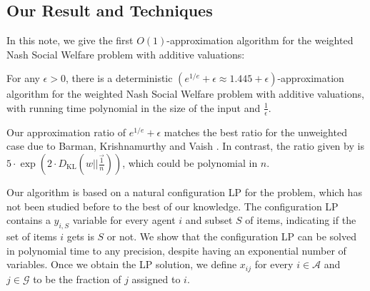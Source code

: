 \documentclass{theoretics}
\newcommand\calA{{\mathcal{A}}}
\newcommand\calG{{\mathcal{G}}}
\begin{document}
\subsection{Our Result and Techniques} 

In this note, we give the first $O(1)$-approximation algorithm for the weighted Nash Social Welfare problem with additive valuations:
\begin{theorem}
    \label{thm:main}
    For any $\epsilon > 0$, there is a deterministic $(e^{1/e} + \epsilon \approx 1.445 + \epsilon)$-approximation algorithm for the weighted Nash Social Welfare problem with additive valuations, with running time polynomial in the size of the input and $\frac1\epsilon$.
\end{theorem}

Our approximation ratio of $e^{1/e} + \epsilon$ matches the best ratio for the unweighted case due to Barman, Krishnamurthy and Vaish \cite{BKV18}.  In contrast, the ratio given by \cite{BLP24} is $5\cdot \exp(2 \cdot D_{\text{KL}}(w || \frac{\vec{1}}{n}))$, which could be polynomial in $n$. 
%

Our algorithm is based on a natural configuration LP for the problem, which has not been studied before to the best of our knowledge.  The configuration LP contains a $y_{i, S}$ variable for every agent $i$ and subset $S$ of items, indicating if the set of items $i$ gets is $S$ or not. We show that the configuration LP can be solved in polynomial time to any precision, despite having an exponential number of variables.  Once we obtain the LP solution, we define $x_{ij}$ for every $i \in \calA$ and $j \in \calG$ to be the fraction of $j$ assigned to $i$. 
\end{document}
